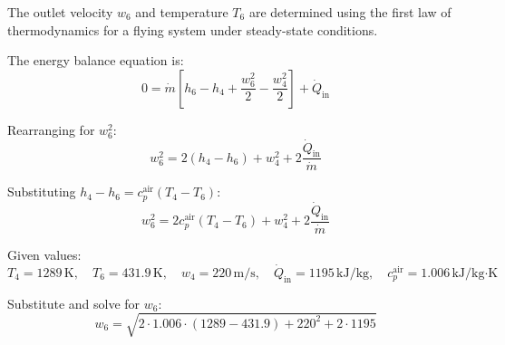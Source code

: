The outlet velocity \( w_6 \) and temperature \( T_6 \) are determined using the first law of thermodynamics for a flying system under steady-state conditions.  

The energy balance equation is:  
\[
0 = \dot{m} \left[ h_6 - h_4 + \frac{w_6^2}{2} - \frac{w_4^2}{2} \right] + \dot{Q}_{\text{in}}
\]  

Rearranging for \( w_6^2 \):  
\[
w_6^2 = 2 \left( h_4 - h_6 \right) + w_4^2 + 2 \frac{\dot{Q}_{\text{in}}}{\dot{m}}
\]  

Substituting \( h_4 - h_6 = c_p^{\text{air}} \left( T_4 - T_6 \right) \):  
\[
w_6^2 = 2 c_p^{\text{air}} \left( T_4 - T_6 \right) + w_4^2 + 2 \frac{\dot{Q}_{\text{in}}}{\dot{m}}
\]  

Given values:  
\[
T_4 = 1289 \, \text{K}, \quad T_6 = 431.9 \, \text{K}, \quad w_4 = 220 \, \text{m/s}, \quad \dot{Q}_{\text{in}} = 1195 \, \text{kJ/kg}, \quad c_p^{\text{air}} = 1.006 \, \text{kJ/kg·K}
\]  

Substitute and solve for \( w_6 \):  
\[
w_6 = \sqrt{2 \cdot 1.006 \cdot (1289 - 431.9) + 220^2 + 2 \cdot 1195}
\]